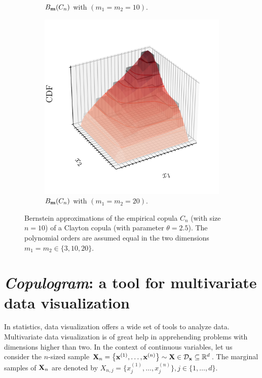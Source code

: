 \begin{figure}
\begin{subfigure}[b]{0.49\textwidth}
        \caption{$B_{{\bf m}}(C_n)$ with $(m_1=m_2=10)$.}
    \end{subfigure}
    \begin{subfigure}[b]{0.49\textwidth}
        \centering
        \includegraphics[width=\linewidth]{../numerical_experiments/chapter3/figures/ebc_m20.png}
        \caption{$B_{{\bf m}}(C_n)$ with $(m_1=m_2=20)$.}
    \end{subfigure}
    \centering
    \caption{Bernstein approximations of the empirical copula $C_n$ (with size $n=10$) of a Clayton copula (with parameter $\theta=2.5$). The polynomial orders are assumed equal in the two dimensions $m_1=m_2\in\{3, 10, 20\}$.}
    \label{fig:ebc_illustration}
\end{figure}

\newpage
\section{\textit{Copulogram}: a tool for multivariate data visualization}\label{sec:copulogram}
In statistics, data visualization offers a wide set of tools to analyze data. 
Multivariate data visualization is of great help in apprehending problems with dimensions higher than two. 
In the context of continuous variables, let us consider the $n$-sized sample ${\bf X}_n = \left\{{\bf x}^{(1)}, \dots, {\bf x}^{(n)}\right\} \sim {\bf X} \in \mathcal{D}_{{\bf x}}\subseteq\mathbb{R}^d$. 
The marginal samples of ${\bf X}_n$ are denoted by $X_{n, j} = \{x_j^{(1)}, \dots, x_j^{(n)}\}, j\in \{1, \dots, d\}$.


